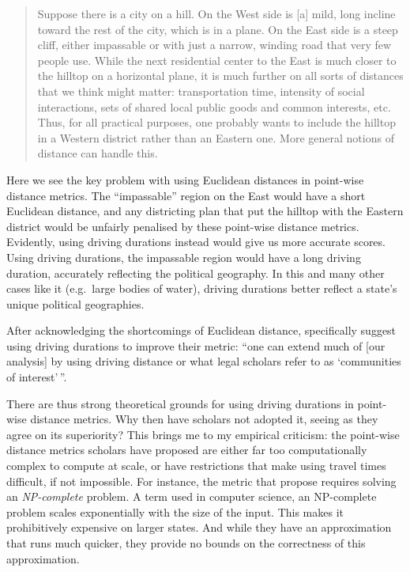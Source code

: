 \documentclass[]{article}
\begin{document}
\begin{quote}
Suppose there is a city on a hill. On the West side is {[}a{]} mild,
long incline toward the rest of the city, which is in a plane. On the
East side is a steep cliff, either impassable or with just a narrow,
winding road that very few people use. While the next residential center
to the East is much closer to the hilltop on a horizontal plane, it is
much further on all sorts of distances that we think might matter:
transportation time, intensity of social interactions, sets of shared
local public goods and common interests, etc. Thus, for all practical
purposes, one probably wants to include the hilltop in a Western
district rather than an Eastern one. More general notions of distance
can handle this.
\end{quote}

Here we see the key problem with using Euclidean distances in point-wise
distance metrics. The ``impassable'' region on the East would have a
short Euclidean distance, and any districting plan that put the hilltop
with the Eastern district would be unfairly penalised by these
point-wise distance metrics. Evidently, using driving durations instead
would give us more accurate scores. Using driving durations, the
impassable region would have a long driving duration, accurately
reflecting the political geography. In this and many other cases like it
(e.g.~large bodies of water), driving durations better reflect a state's
unique political geographies.

After acknowledging the shortcomings of Euclidean distance,
\citeauthor{fh2011} specifically suggest using driving durations to
improve their metric: ``one can extend much of {[}our analysis{]} by
using driving distance or what legal scholars refer to as `communities
of interest'\,''.

There are thus strong theoretical grounds for using driving durations in
point-wise distance metrics. Why then have scholars not adopted it,
seeing as they agree on its superiority? This brings me to my empirical
criticism: the point-wise distance metrics scholars have proposed are
either far too computationally complex to compute at scale, or have
restrictions that make using travel times difficult, if not impossible.
For instance, the metric that \citet{fh2011} propose requires solving an
\emph{NP-complete} problem. A term used in computer science, an
NP-complete problem scales exponentially with the size of the input.
This makes it prohibitively expensive on larger states. And while they
have an approximation that runs much quicker, they provide no bounds on
the correctness of this approximation.
\end{document}
